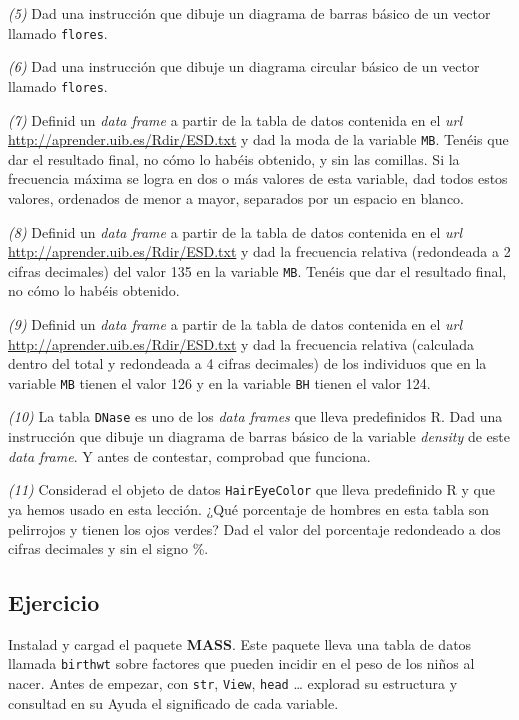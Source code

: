 \documentclass[
]{book}
\theoremstyle{definition}
\theoremstyle{definition}
\theoremstyle{definition}
\theoremstyle{remark}
\begin{document}
\emph{(5)} Dad una instrucción que dibuje un diagrama de barras básico de un vector llamado \texttt{flores}.

\emph{(6)} Dad una instrucción que dibuje un diagrama circular básico de un vector llamado \texttt{flores}.

\emph{(7)} Definid un \emph{data frame} a partir de la tabla de datos contenida en el \emph{url} \url{http://aprender.uib.es/Rdir/ESD.txt} y dad la moda de la variable \texttt{MB}. Tenéis que dar el resultado final, no cómo lo habéis obtenido, y sin las comillas. Si la frecuencia máxima se logra en dos o más valores de esta variable, dad todos estos valores, ordenados de menor a mayor, separados por un espacio en blanco.

\emph{(8)} Definid un \emph{data frame} a partir de la tabla de datos contenida en el \emph{url} \url{http://aprender.uib.es/Rdir/ESD.txt} y dad la frecuencia relativa (redondeada a 2 cifras decimales) del valor 135 en la variable \texttt{MB}. Tenéis que dar el resultado final, no cómo lo habéis obtenido.

\emph{(9)} Definid un \emph{data frame} a partir de la tabla de datos contenida en el \emph{url} \url{http://aprender.uib.es/Rdir/ESD.txt} y dad la frecuencia relativa (calculada dentro del total y redondeada a 4 cifras decimales) de los individuos que en la variable \texttt{MB} tienen el valor 126 y en la variable \texttt{BH} tienen el valor 124.

\emph{(10)} La tabla \texttt{DNase} es uno de los \emph{data frames} que lleva predefinidos R. Dad una instrucción que dibuje un diagrama de barras básico de la variable \emph{density} de este \emph{data frame}. Y antes de contestar, comprobad que funciona.

\emph{(11)} Considerad el objeto de datos \texttt{HairEyeColor} que lleva predefinido R y que ya hemos usado en esta lección. ¿Qué porcentaje de hombres en esta tabla son pelirrojos y tienen los ojos verdes? Dad el valor del porcentaje redondeado a dos cifras decimales y sin el signo \%.

\hypertarget{ejercicio-7}{%
\subsection*{Ejercicio}\label{ejercicio-7}}

Instalad y cargad el paquete \textbf{MASS}. Este paquete lleva una tabla de datos llamada \texttt{birthwt} sobre factores que pueden incidir en el peso de los niños al nacer. Antes de empezar, con \texttt{str}, \texttt{View}, \texttt{head} \ldots{} explorad su estructura y consultad en su Ayuda el significado de cada variable.
\end{document}
